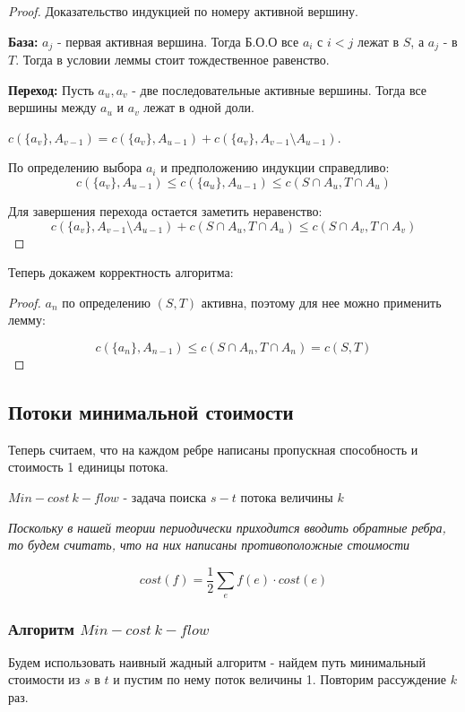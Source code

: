  \begin{proof}
  Доказательство индукцией по номеру активной вершину.

  \textbf{База:} $a_j$ - первая активная вершина. Тогда Б.О.О все $a_i$ с $i < j$ лежат в $S$, а $a_j$ - в $T$. Тогда в условии леммы стоит тождественное равенство.

  \textbf{Переход:}
    Пусть $a_u, a_v$ - две последовательные активные вершины. Тогда все вершины между $a_u$ и $a_v$ лежат в одной доли.

    $c(\{a_v\}, A_{v - 1}) = c(\{a_v\}, A_{u - 1}) + c(\{a_v\}, A_{v - 1} \setminus A_{u - 1})$. 

    По определению выбора $a_i$ и предположению индукции справедливо:
    $$c(\{a_v\}, A_{u - 1}) \le c(\{a_u\}, A_{u - 1}) \le c(S \cap A_u, T \cap A_{u})$$

    Для завершения перехода остается заметить неравенство:
    $$c(\{a_v\}, A_{v - 1} \setminus A_{u - 1})  + c(S \cap A_u, T \cap A_{u})\le c(S \cap A_v, T \cap A_{v})$$
 \end{proof}

 Теперь докажем корректность алгоритма:
 \begin{proof}
  $a_n$ по определению $(S, T)$ активна, поэтому для нее можно применить лемму:

  $$c(\{a_n\}, A_{n-1}) \le c(S \cap A_n, T \cap A_n) = c(S, T)$$
 \end{proof}

\subsection{Потоки минимальной стоимости}

Теперь считаем, что на каждом ребре написаны пропускная способность и стоимость 1 единицы потока.

\begin{definition}
  $Min-cost \ k-flow$ - задача поиска $s-t$ потока величины $k$
\end{definition}

\textit{Поскольку в нашей теории периодически приходится вводить обратные ребра, то будем считать, что на них написаны противоположные стоимости}

\begin{definition}
  $$cost(f) = \frac{1}{2} \sum_e{f(e) \cdot cost(e)}$$ 
\end{definition}

\subsubsection{Алгоритм $Min-cost \ k-flow$}
Будем использовать наивный жадный алгоритм - найдем путь минимальный стоимости из $s$ в $t$ и пустим по нему поток величины 1. Повторим рассуждение $k$ раз.

